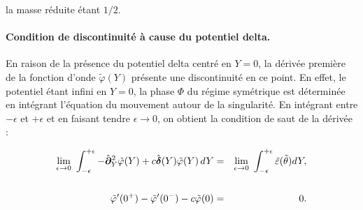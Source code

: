 la masse réduite étant $1/2$.

\paragraph{Condition de discontinuité à cause du potentiel delta.}
En raison de la présence du potentiel delta centré en $Y = 0$, la dérivée première de la fonction d’onde $\tilde{\varphi}(Y)$ présente une discontinuité en ce point. En effet, le potentiel étant infini en $Y = 0$, la phase $\Phi$ du régime symétrique est déterminée en intégrant l’équation du mouvement autour de la singularité. En intégrant entre $- \epsilon$ et $+ \epsilon$ et en faisant tendre $\epsilon \to 0$, on obtient la condition de saut de la dérivée :








\begin{eqnarray*}
	\underset{ \epsilon \to 0 }{\lim} \int_{-\epsilon}^{+\epsilon}  - 	\operator{\partial}_Y^2\tilde{\varphi}(Y) + c \operator{\delta} ( Y )\tilde{\varphi}(Y) \, dY  & = & \underset{ \epsilon \to 0 }{\lim}  \int_{-\epsilon}^{+\epsilon}  \tilde{\varepsilon}(\tilde{\theta})d Y ,\\
	\\
	\tilde{\varphi}'(0^+) - \tilde{\varphi}'(0^-) - c \tilde{\varphi} (  0 ) & = & 0 .
\end{eqnarray*}


